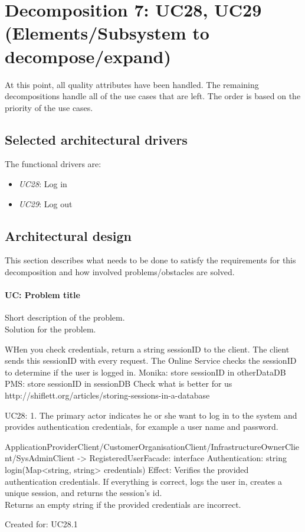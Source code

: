 \section{Decomposition 7: UC28, UC29 (Elements/Subsystem to decompose/expand)}
    At this point, all quality attributes have been handled. The remaining
    decompositions handle all of the use cases that are left. The order
    is based on the priority of the use cases.


\subsection{Selected architectural drivers}
    The functional drivers are:
    \begin{itemize}
        \item \emph{UC28}: Log in \\
        \item \emph{UC29}: Log out \\
    \end{itemize}


\subsection{Architectural design}
    This section describes what needs to be done to satisfy the requirements for
    this decomposition and how involved problems/obstacles are solved.

    \paragraph{UC: Problem title}
        Short description of the problem.\\
        Solution for the problem.

        WHen you check credentials, return a string sessionID to the client.
        The client sends this sessionID with every request.
        The Online Service checks the sessionID to determine if the user is logged in.
        Monika: store sessionID in otherDataDB
        PMS: store sessionID in sessionDB
        Check what is better for us
        http://shiflett.org/articles/storing-sessions-in-a-database

        UC28:
            1. The primary actor indicates he or she want to log in to the system and provides authentication credentials, for example a user name and password.

                ApplicationProviderClient/CustomerOrganisationClient/InfrastructureOwnerClient/SysAdminClient -> RegisteredUserFacade: interface Authentication: string login(Map<string, string> credentials)
                    Effect: Verifies the provided authentication credentials. If everything is correct, logs the user in, creates a unique session, and returns the session's id. \\
                            Returns an empty string if the provided credentials are incorrect.
                    \item Created for: UC28.1

